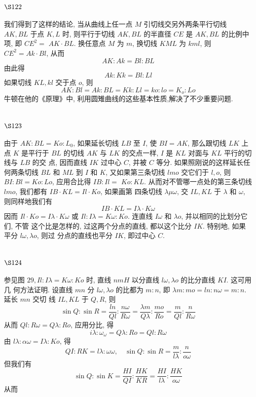 \section{$\S 122$}

我们得到了这样的结论, 当从曲线上任一点 $M$ 引切线交另外两条平行切线 $A K, B L$ 于点 $K, L$ 时, 则平行于切线 $A K, B L$ 的半直径 $C E$ 是 $A K, B L$ 的比例中项, 即 $C E^{2}=$ $A K \cdot B L$. 换任意点 $M$ 为 $m$, 换切线 $K M L$ 为 $k m l$, 则 $C E^{2}=A k \cdot B l$, 从而
\[
A K: A k=B l: B L
\]
由此得
\[
A k: K k=B l: L l
\]
如果切线 $K L, k l$ 交于点 $o$, 则
\[
A K: B l=A k: B L=K k: L l=k o: l o=K_{o}: L o
\]
牛顿在他的《原理》中, 利用圆雉曲线的这些基本性质,解决了不少重要问题.

\section{$\S 123$}

由于 $A K: B L=K o: L_{0}$, 如果延长切线 $L B$ 至 $I$, 使 $B I=A K$, 那么跟切线 $L K$ 上点 $K$ 是平行于 $B L$ 的切线 $A K$ 与 $L K$ 的交点一样, $I$ 是 $K L$ 对面与 $K L$ 平行的切线与 $L B$ 的交 点, 因而直线 $I K$ 过中心 $C$, 并被 $C$ 等分. 如果照刚说的这样延长任何两条切线 $B L$ 和 $M L$ 到 $I$ 和 $K$, 又如果第三条切线 $l m o$ 交它们于 $l, o$, 则 $B I: B l=K o: L o$, 应用合比得 $I B: I l=$ $K o: K L$. 从而对不管哪一点处的第三条切线 $l m o$, 我们都有 $I B \cdot K L=I l \cdot K o$, 如果画第 四条切线 $\lambda \mu \omega$, 交 $I L, K L$ 于 $\lambda$ 和 $\omega$, 则同样地我们有
\[
I B \cdot K L=I \lambda \cdot K \omega
\]
因而 $I l \cdot K o=I \lambda \cdot K \omega$ 或 $I l: I \lambda=K \omega: K o$. 连直线 $I \omega$ 和 $\lambda o$, 并以相同的比划分它们, 不管 这个比是怎样的, 过这两个分点的直线, 都以这个比分 $I K$. 特别地, 如果平分 $l \omega, \lambda o$, 则过 分点的直线也平分 $I K$, 即过中心 $C$.

\section{$\S 124$}

参见图 $29, I l: I \lambda=K \omega: K o$ 时, 直线 $n m H$ 以分直线 $l \omega, \lambda o$ 的比分直线 $K I$. 这可用几 何方法证明. 设直线 $m n$ 分 $l \omega, \lambda o$ 的比都为 $m: n$, 即 $\lambda m: m o=l n: n \omega=m: n$. 延长 $m n$ 交切 线 $I L, K L$ 于 $Q, R$, 则
\[
\sin Q: \sin R=\frac{l n}{Q l}: \frac{n \omega}{R \omega}=\frac{\lambda m}{Q \lambda}: \frac{m o}{R o}=\frac{m}{Q l}: \frac{n}{R \omega}
\]
从而 $Q l: R \omega=Q \lambda: R o$, 应用分比, 得
\[
i \lambda: \omega_{\omega}=Q \lambda: R o=Q l: R \omega
\]
由 $l \lambda: \alpha \omega=I \lambda: K o$, 得
\[
Q I: R K=l \lambda: \omega \omega, \quad \sin Q: \sin R=\frac{m}{l \lambda}: \frac{n}{o \omega}
\]
但我们有
\[
\sin Q: \sin K=\frac{H I}{Q I}: \frac{H K}{K R}=\frac{H I}{l \lambda}: \frac{H K}{o \omega}
\]
从而


